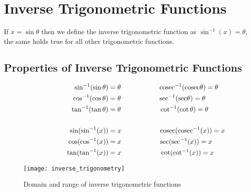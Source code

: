 \section{Inverse Trigonometric Functions}
If \textit{$x = \sin\theta$} then we define the inverse trigonometric function as \textit{$\sin^{-1}(x) = \theta$}, the same holds true for all other trigonometric functions.

\subsection{Properties of Inverse Trigonometric Functions}

\begin{align*}
\hspace{20mm} \sin^{-1}(\sin\theta) &= \theta  \hspace{20mm} \mathrm{cosec}^{-1}(\mathrm{cosec}\theta) = \theta\\
\hspace{20mm} \cos^{-1}(\cos\theta) &= \theta  \hspace{20mm} \mathrm{sec}^{-1}(\mathrm{sec}\theta) = \theta\\ 
\hspace{20mm} \tan^{-1}(\tan\theta) &= \theta \hspace{20mm} \cot^{-1}(\cot\theta) = \theta \\ \\
\hspace{20mm} \sin(\sin^{-1}(x)) &= x  \hspace{20mm} \mathrm{cosec}(\mathrm{cosec}^{-1}(x)) = x\\
\hspace{20mm} \cos(\cos^{-1}(x)) &= x  \hspace{20mm} \mathrm{sec}(\mathrm{sec}^{-1}(x)) = x\\ 
\hspace{20mm} \tan(\tan^{-1}(x)) &= x \hspace{20mm} \cot(\cot^{-1}(x)) = x 
\end{align*}

\begin{figure}[ht]
    \centering
    \texttt{[image: inverse\_trigonometry]}
    \caption{Domain and range of inverse trigonometric functions}
    \label{inverse_trig}
\end{figure}

